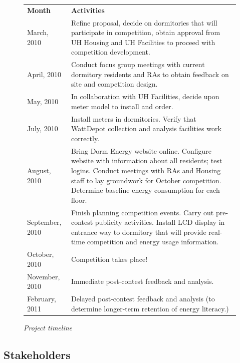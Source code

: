 \documentclass[11pt]{article}
\begin{document}
\begin{figure}[!ht]
\small
\begin{tabular}{p{1in}p{5in}} \hline
{\bf Month} & {\bf Activities}  \\
March, 2010 &  Refine proposal, decide on dormitories that will
participate in competition, obtain approval from UH Housing and UH Facilities to proceed with competition development. \\

April, 2010 & Conduct focus group meetings with current
dormitory residents and RAs to obtain feedback on site and competition
design. \\

May, 2010 &  In collaboration with UH Facilities, decide upon meter model to install and order. \\

July, 2010 & Install meters in dormitories.  Verify that WattDepot collection and analysis facilities work correctly. \\

August, 2010 & Bring Dorm Energy website online.  Configure website with information about all residents; test logins.  Conduct meetings with RAs and Housing staff to lay groundwork for October competition. Determine baseline energy consumption for each floor.\\

September, 2010 & Finish planning competition events.  Carry out pre-contest publicity activities.  Install LCD display in entrance way to dormitory that will provide real-time competition and energy usage information.    \\

October, 2010 & Competition takes place! \\

November, 2010 &  Immediate post-contest feedback and analysis.  \\

February, 2011 &  Delayed post-contest feedback and analysis (to determine longer-term retention of energy literacy.)  \\ \hline
\end{tabular} 
\normalsize
\caption{{\em Project timeline}}
\label{fig:timeline}
\end{figure}

\subsection{Stakeholders}
\end{document}
